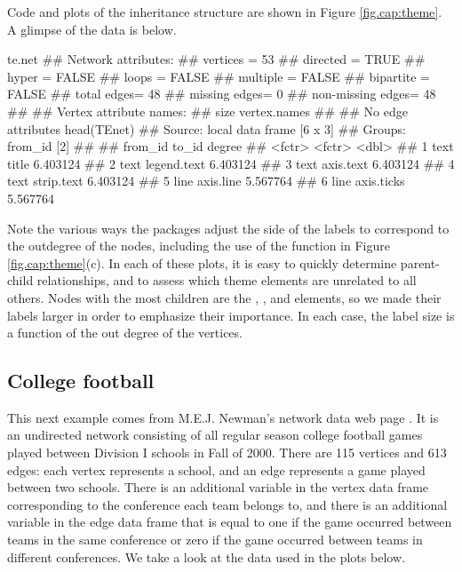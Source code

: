 \noindent
Code and plots of the inheritance structure are shown in Figure \ref{fig.cap:theme}. A glimpse of the data is below. 
\begin{example}
te.net
##  Network attributes:
##   vertices = 53 
##   directed = TRUE 
##   hyper = FALSE 
##   loops = FALSE 
##   multiple = FALSE 
##   bipartite = FALSE 
##   total edges= 48 
##     missing edges= 0 
##     non-missing edges= 48 
## 
##  Vertex attribute names: 
##     size vertex.names 
## 
## No edge attributes
head(TEnet)
## Source: local data frame [6 x 3]
## Groups: from_id [2]
## 
##   from_id       to_id   degree
##    <fctr>      <fctr>    <dbl>
## 1    text       title 6.403124
## 2    text legend.text 6.403124
## 3    text   axis.text 6.403124
## 4    text  strip.text 6.403124
## 5    line   axis.line 5.567764
## 6    line  axis.ticks 5.567764


\end{example}
Note the various ways the packages adjust the side of the labels to correspond to the outdegree of the nodes, including the use of the  function in Figure \ref{fig.cap:theme}(c). In each of these plots, it is easy to quickly determine  parent-child relationships, and to assess which theme elements are unrelated to all others. Nodes with the most children are the , , and  elements, so we made their labels larger in order to emphasize their importance. In each case, the label size is a function of the out degree of the vertices.

\subsection{College football}

This next example comes from M.E.J. Newman's network data web page \citep{football}.  It is an undirected network consisting of all regular season college football games played between Division I schools in Fall of 2000.  There are 115 vertices and 613 edges: each vertex represents a school, and an edge represents a game played between two schools. There is an additional variable in the vertex data frame corresponding to the conference each team belongs to, and there is an additional variable in the edge data frame that is equal to one if the game occurred between teams in the same conference or zero if the game occurred between teams in different conferences. We take a look at the data used in the plots below.


